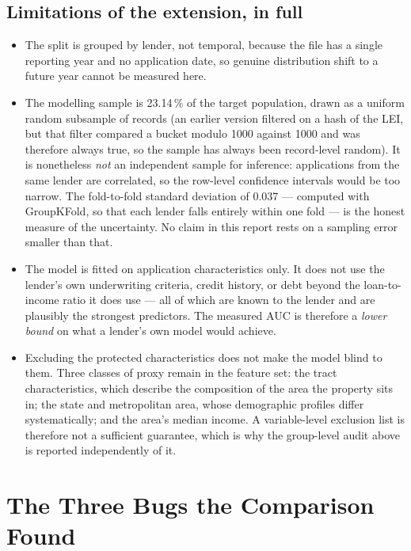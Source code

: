 \documentclass[sigconf,balance=false]{acmart}
\begin{document}
\subsection{Limitations of the extension, in full}

\begin{itemize}
  \item The split is grouped by lender, not temporal, because the file has a
        single reporting year and no application date, so genuine
        distribution shift to a future year cannot be measured here.
  \item The modelling sample is 23.14\,\% of the target population, drawn
        as a uniform random subsample of records (an earlier version
        filtered on a hash of the LEI, but that filter compared a bucket
        modulo 1000 against 1000 and was therefore always true, so the
        sample has always been record-level random). It is nonetheless
        \emph{not} an independent sample for inference: applications from
        the same lender are correlated, so the row-level confidence
        intervals would be too narrow. The fold-to-fold standard
        deviation of 0.037 --- computed with GroupKFold, so that each
        lender falls entirely within one fold --- is the honest measure of
        the uncertainty. No claim in this report rests on a sampling error
        smaller than that.
  \item The model is fitted on application characteristics only. It does not
        use the lender's own underwriting criteria, credit history, or debt
        beyond the loan-to-income ratio it does use --- all of which are
        known to the lender and are
        plausibly the strongest predictors. The measured AUC is therefore a
        \emph{lower bound} on what a lender's own model would achieve.
  \item Excluding the protected characteristics does not make the model blind
        to them. Three classes of proxy remain in the feature set: the tract
        characteristics, which describe the composition of the area the
        property sits in; the state and metropolitan area, whose
        demographic profiles differ systematically; and the area's median
        income. A variable-level exclusion list is therefore not a
        sufficient guarantee, which is why the group-level audit above is
        reported independently of it.
\end{itemize}

\FloatBarrier

\section{The Three Bugs the Comparison Found}\label{app:bugs}
\end{document}
